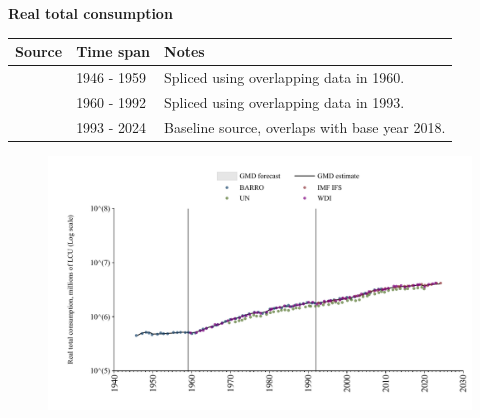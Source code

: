 \documentclass[12pt,a4paper,landscape]{article}
\begin{document}
\begin{adjustbox}{max totalsize={\paperwidth}{\paperheight},center}
\begin{minipage}[t][\textheight][t]{\textwidth}
\vspace*{0.5cm}
{}
\begin{center}
{\Large\bfseries Real total consumption}
\end{center}
\vspace{0.5cm}
\begin{table}[H]
\centering
\small
\begin{tabular}{|l|l|l|}
\hline
\textbf{Source} & \textbf{Time span} & \textbf{Notes} \\
\hline
\rowcolor{white}\cite{BARRO}& 1946 - 1959 &Spliced using overlapping data in 1960. \\
\rowcolor{lightgray}\cite{WDI}& 1960 - 1992 &Spliced using overlapping data in 1993. \\
\rowcolor{white}\cite{IMF_IFS}& 1993 - 2024 &Baseline source, overlaps with base year 2018. \\
\hline
\end{tabular}
\end{table}
\begin{figure}[H]
\centering
\includegraphics[width=\textwidth,height=0.6\textheight,keepaspectratio]{graphs/ZAF_rcons.pdf}
\end{figure}
\end{minipage}
\end{adjustbox}
\end{document}
